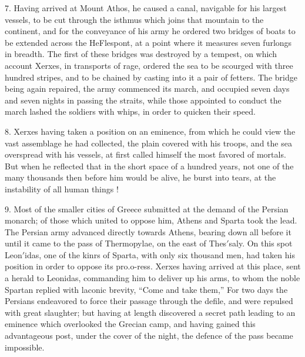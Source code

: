 \documentclass[openany,a4paper]{memoir}
\begin{document}
7. Having arrived at Mount Athos, he caused a canal, navigable for his largest vessels, to be cut through the isthmus 
which joins that mountain to the continent, and for the conveyance of his army he ordered two bridges of boats to be 
extended across the HeFlespont, at a point where it measures 
seven furlongs in breadth. The first of these bridges was 
destroyed by a tempest, on which account Xerxes, in transports of rage, ordered the sea to be scourged with three 
hundred stripes, and to be chained by casting into it a pair 
of fetters. The bridge being again repaired, the army commenced its march, and occupied seven days and seven nights 
in passing the straits, while those appointed to conduct the 
march lashed the soldiers with whips, in order to quicken 
their speed. 

8. Xerxes having taken a position on an eminence, from 
which he could view the vast assemblage he had collected, 
the plain covered with his troops, and the sea overspread 
with his vessels, at first called himself the most favored of 
mortals. But when he reflected that in the short space of a 
hundred years, not one of the many thousands then before 
him would be alive, he burst into tears, at the instability of 
all human things ! 

9. Most of the smaller cities of Greece submitted at the demand of the Persian monarch; of those which united to oppose him, Athens and Sparta took the lead. The Persian 
army advanced directly towards Athens, bearing down all 
before it until it came to the pass of Thermopylae, on the east 
of Thes$'$saly. On this spot Leon$'$idas, one of the kinrs of 
Sparta, with only six thousand men, had taken his position 
in order to oppose its pro.o-ress. Xerxes having arrived at 
this place, sent a herald to Leonidas, commanding him to deliver up his arms, to whom the noble Spartan replied with 
laconic brevity, ``Come and take them,'' For two days the 
Persians endeavored to force their passage through the defile, 
and were repulsed with great slaughter; but having at length 
discovered a secret path leading to an eminence which overlooked the Grecian camp, and having gained this advantageous post, under the cover of the night, the defence of 
the pass became impossible. 
\end{document}
